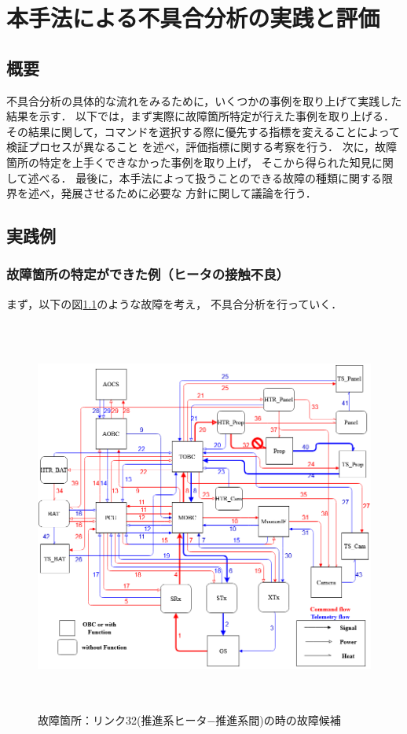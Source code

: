 \documentclass[11pt]{jsreport}
\begin{document}
\fi

\chapter{本手法による不具合分析の実践と評価}

\section{概要}
不具合分析の具体的な流れをみるために，いくつかの事例を取り上げて実践した結果を示す．
以下では，まず実際に故障箇所特定が行えた事例を取り上げる．
その結果に関して，コマンドを選択する際に優先する指標を変えることによって検証プロセスが異なること
を述べ，評価指標に関する考察を行う．
次に，故障箇所の特定を上手くできなかった事例を取り上げ，
そこから得られた知見に関して述べる．
最後に，本手法によって扱うことのできる故障の種類に関する限界を述べ，発展させるために必要な
方針に関して議論を行う．

\section{実践例}
\subsection{故障箇所の特定ができた例（ヒータの接触不良）}
まず，以下の図\ref{fig:fault_mode1}のような故障を考え，
不具合分析を行っていく．\\
\begin{figure}[H]
   \centering
      \includegraphics[height=13.0cm]{figure/fault_mode1.png}
      \caption{故障箇所：リンク32(推進系ヒータ−推進系間)の時の故障候補}
      \label{fig:fault_mode1}
\end{figure}
\end{document}
